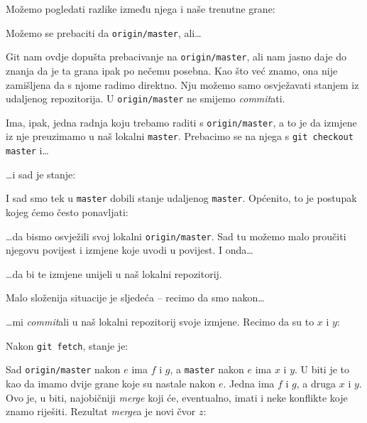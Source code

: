 Možemo pogledati razlike između njega i naše trenutne grane:


Možemo se prebaciti da \verb+origin/master+, ali\dots



Git nam ovdje dopušta prebacivanje na \verb+origin/master+, ali nam jasno daje do znanja da je ta grana ipak po nečemu posebna.
Kao što već znamo, ona nije zamišljena da s njome radimo direktno.
Nju možemo samo osvježavati stanjem iz udaljenog repozitorija.
U \verb+origin/master+ ne smijemo \emph{commit}ati.

Ima, ipak, jedna radnja koju trebamo raditi s \verb+origin/master+, a to je da izmjene iz nje preuzimamo u naš lokalni \verb+master+.
Prebacimo se na njega s \verb+git checkout master+ i\dots{}


\dots{}i sad je stanje:



I sad smo tek u \verb+master+ dobili stanje udaljenog \verb+master+.
Općenito, to je postupak kojeg ćemo često ponavljati:


\dots{}da bismo osvježili svoj lokalni \verb+origin/master+.
Sad tu možemo malo proučiti njegovu povijest i izmjene koje uvodi u povijest.
I onda\dots


\dots{}da bi te izmjene unijeli u naš lokalni repozitorij.

Malo složenija situacije je sljedeća -- recimo da smo nakon\dots{}



\dots{}mi \emph{commit}ali u naš lokalni repozitorij svoje izmjene. Recimo da su to $x$ i $y$:



Nakon \verb+git fetch+, stanje je:



Sad \verb+origin/master+ nakon $e$ ima $f$ i $g$, a \verb+master+ nakon $e$ ima $x$ i $y$.
U biti je to kao da imamo dvije grane koje su nastale nakon $e$. Jedna ima $f$ i $g$, a druga $x$ i $y$.
Ovo je, u biti, najobičniji \emph{merge} koji će, eventualno, imati i neke konflikte koje znamo riješiti.
Rezultat \emph{merge}a je novi čvor $z$:

